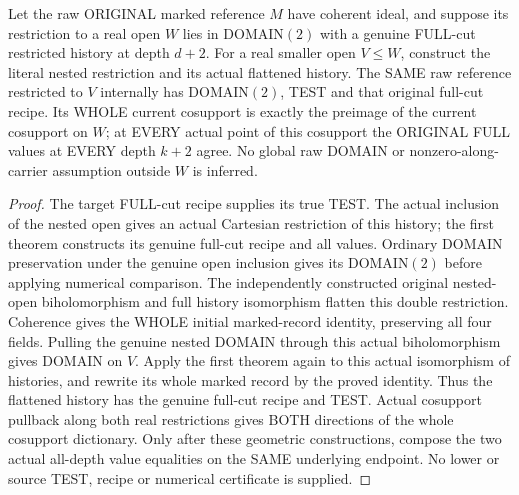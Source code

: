 \begin{theorem}
\label{hir:original-bound-two-full-cut-nested-open-locality}
\leanok
Let the raw ORIGINAL marked reference $M$ have coherent ideal, and suppose
its restriction to a real open $W$ lies in DOMAIN$(2)$ with a genuine
FULL-cut restricted history at depth $d+2$. For a real smaller open
$V\le W$, construct the literal nested restriction and its actual
flattened history. The SAME raw reference restricted to $V$ internally
has DOMAIN$(2)$, TEST and that original full-cut recipe. Its WHOLE current
cosupport is exactly the preimage of the current cosupport on $W$; at
EVERY actual point of this cosupport the ORIGINAL FULL values at EVERY
depth $k+2$ agree. No global raw DOMAIN or nonzero-along-carrier assumption
outside $W$ is inferred.
\end{theorem}
\begin{proof}
The target FULL-cut recipe supplies its true TEST. The actual inclusion of
the nested open gives an actual Cartesian restriction of this history;
the first theorem constructs its genuine full-cut recipe and all values.
Ordinary DOMAIN preservation under the genuine open inclusion gives its
DOMAIN$(2)$ before applying numerical comparison. The independently
constructed original nested-open biholomorphism and full history
isomorphism flatten this double restriction. Coherence gives the WHOLE
initial marked-record identity, preserving all four fields. Pulling the
genuine nested DOMAIN through this actual biholomorphism gives DOMAIN on
$V$. Apply the first theorem again to this actual isomorphism of histories,
and rewrite its whole marked record by the proved identity. Thus the
flattened history has the genuine full-cut recipe and TEST. Actual
cosupport pullback along both real restrictions gives BOTH directions of
the whole cosupport dictionary. Only after these geometric constructions,
compose the two actual all-depth value equalities on the SAME underlying
endpoint. No lower or source TEST, recipe or numerical certificate is
supplied.
\end{proof}

